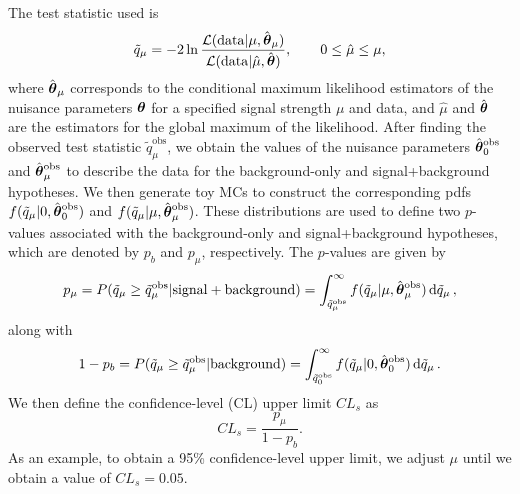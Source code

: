 The test statistic used is
\begin{equation}
  \tilde{q}_\mu=-2\ln\frac{\mathcal{L}(\mathrm{data}|\mu,\hat{\vb*{\theta}}_\mu)}{\mathcal{L}(\mathrm{data}|\hat{\mu},\hat{\vb*{\theta}})},\qquad 0\leq\hat{\mu}\leq\mu,
\end{equation}
where $\hat{\vb*{\theta}}_\mu$ corresponds to the conditional maximum likelihood estimators of the nuisance parameters $\vb*{\theta}$ for a specified signal strength $\mu$ and data, and $\hat{\mu}$ and $\hat{\vb*{\theta}}$ are the estimators for the global maximum of the likelihood.
After finding the observed test statistic $\tilde{q}_\mu^\mathrm{obs}$, we obtain the values of the nuisance parameters $\hat{\vb*{\theta}}_0^\mathrm{obs}$ and $\hat{\vb*{\theta}}_\mu^\mathrm{obs}$ to describe the data for the background-only and signal+background hypotheses.
We then generate toy MCs to construct the corresponding pdfs $f(\tilde{q}_\mu|0,\hat{\vb*{\theta}}_0^\mathrm{obs})$ and $f(\tilde{q}_\mu|\mu,\hat{\vb*{\theta}}_\mu^\mathrm{obs})$.
These distributions are used to define two $p$-values associated with the background-only and signal+background hypotheses, which are denoted by $p_b$ and $p_\mu$, respectively.
The $p$-values are given by
\begin{equation}
  p_\mu=P(\tilde{q}_\mu\geq\tilde{q}_\mu^\mathrm{obs}|\mathrm{signal}+\mathrm{background})=\int_{\tilde{q}_\mu^\mathrm{obs}}^\infty f(\tilde{q}_\mu|\mu,\hat{\vb*{\theta}}_\mu^\mathrm{obs})\dd{\tilde{q}_\mu},
\end{equation}
along with
\begin{equation}
  1-p_b=P(\tilde{q}_\mu\geq\tilde{q}_\mu^\mathrm{obs}|\mathrm{background})=\int_{\tilde{q}_0^\mathrm{obs}}^\infty f(\tilde{q}_\mu|0,\hat{\vb*{\theta}}_0^\mathrm{obs})\dd{\tilde{q}_\mu}.
\end{equation}
We then define the confidence-level (CL) upper limit $CL_s$ as
\begin{equation}
  CL_s=\frac{p_\mu}{1-p_b}.
\end{equation}
As an example, to obtain a 95\% confidence-level upper limit, we adjust $\mu$ until we obtain a value of $CL_s=0.05$.

